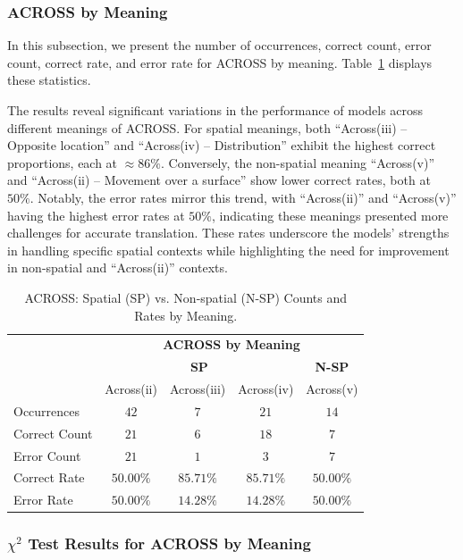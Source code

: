 \subsubsection{ACROSS by Meaning}

In this subsection, we present the number of occurrences, correct count, error count, correct rate, and error rate for ACROSS by meaning. Table~\ref{tab:across-senses} displays these statistics. 

The results reveal significant variations in the performance of models across different meanings of ACROSS. For spatial meanings, both ``Across(iii) -- Opposite location'' and ``Across(iv) -- Distribution'' exhibit the highest correct proportions, each at $\approx86\%$. Conversely, the non-spatial meaning ``Across(v)'' and ``Across(ii) -- Movement over a surface'' show lower correct rates, both at $50\%$. Notably, the error rates mirror this trend, with ``Across(ii)'' and ``Across(v)'' having the highest error rates at $50\%$, indicating these meanings presented more challenges for accurate translation. These rates underscore the models' strengths in handling specific spatial contexts while highlighting the need for improvement in non-spatial and ``Across(ii)'' contexts.


\begin{table}[htb]
\centering
\begin{tabular}{lcccc}
\toprule
 & \multicolumn{4}{c}{\textbf{ACROSS by Meaning}} \\ 
 & \multicolumn{3}{c}{\textbf{SP}} & \textbf{N-SP} \\ 
 & Across(ii) & Across(iii) & Across(iv) & Across(v) \\
\midrule
Occurrences & $42$ & $7$ & $21$ & $14$ \\
Correct Count & $21$ & $6$ & $18$ & $7$ \\ 
Error Count & $21$ & $1$ & $3$ & $7$ \\ 
\midrule
Correct Rate & $50.00\%$ & $\mathbf{85.71\%}$ & $\mathbf{85.71\%}$ & $50.00\%$ \\ 
\midrule
Error Rate & $\mathbf{50.00\%}$ & $14.28\%$ & $14.28\%$ & $\mathbf{50.00\%}$ \\ 
\bottomrule
\end{tabular}
\caption{ACROSS: Spatial (SP) vs. Non-spatial (N-SP) Counts and Rates by Meaning.}
\label{tab:across-senses}
\end{table}


\subsubsection{$\chi^2$ Test Results for ACROSS by Meaning} 

